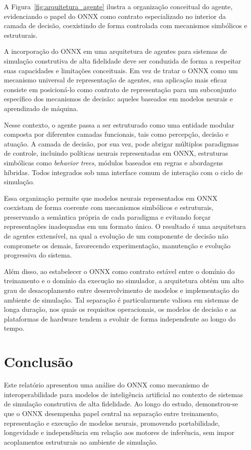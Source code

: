 A Figura~\ref{fig:arquitetura_agente} ilustra a organização conceitual do agente, evidenciando o papel do ONNX como contrato especializado no interior da camada de decisão, coexistindo de forma controlada com mecanismos simbólicos e estruturais.

A incorporação do ONNX em uma arquitetura de agentes para sistemas de simulação construtiva de alta fidelidade deve ser conduzida de forma a respeitar suas capacidades e limitações conceituais. Em vez de tratar o ONNX como um mecanismo universal de representação de agentes, sua aplicação mais eficaz consiste em posicioná-lo como contrato de representação para um subconjunto específico dos mecanismos de decisão: aqueles baseados em modelos neurais e aprendizado de máquina.

Nesse contexto, o agente passa a ser estruturado como uma entidade modular composta por diferentes camadas funcionais, tais como percepção, decisão e atuação. A camada de decisão, por sua vez, pode abrigar múltiplos paradigmas de controle, incluindo políticas neurais representadas em ONNX, estruturas simbólicas como \emph{behavior trees}, módulos baseados em regras e abordagens híbridas. Todos integrados sob uma interface comum de interação com o ciclo de simulação.

Essa organização permite que modelos neurais representados em ONNX coexistam de forma coerente com mecanismos simbólicos e estruturais, preservando a semântica própria de cada paradigma e evitando forçar representações inadequadas em um formato único. O resultado é uma arquitetura de agentes extensível, na qual a evolução de um componente de decisão não compromete os demais, favorecendo experimentação, manutenção e evolução progressiva do sistema.

Além disso, ao estabelecer o ONNX como contrato estável entre o domínio do treinamento e o domínio da execução no simulador, a arquitetura obtém um alto grau de desacoplamento entre desenvolvimento de modelos e implementação do ambiente de simulação. Tal separação é particularmente valiosa em sistemas de longa duração, nos quais os requisitos operacionais, os modelos de decisão e as plataformas de hardware tendem a evoluir de forma independente ao longo do tempo.

\section{Conclusão}

Este relatório apresentou uma análise do ONNX como mecanismo de interoperabilidade para modelos de inteligência artificial no contexto de sistemas de simulação construtiva de alta fidelidade. Ao longo do estudo, demonstrou-se que o ONNX desempenha papel central na separação entre treinamento, representação e execução de modelos neurais, promovendo portabilidade, longevidade e independência em relação aos motores de inferência, sem impor acoplamentos estruturais ao ambiente de simulação.

